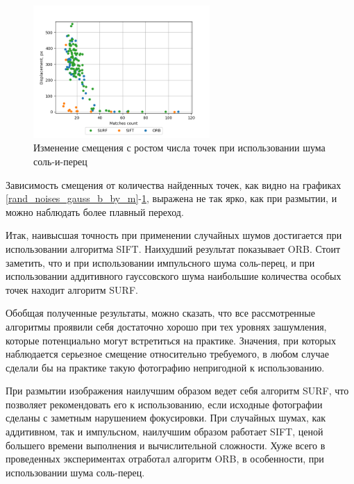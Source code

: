 {{{	\begin{figure}[H]
		\centering                             
		\includegraphics[width=0.6\textwidth,keepaspectratio]{ex2/sp/Rand_noises_d_by_m.png}      
		\centering\caption{  Изменение смещения с ростом числа точек при использовании шума соль-и-перец}
		\label{rand_noises_sp_b_by_m}                           
	\end{figure} 
	
	Зависимость смещения от количества найденных точек, как видно на графиках \ref{rand_noises_gauss_b_by_m}-\ref{rand_noises_sp_b_by_m}, выражена не так ярко, как при размытии, и можно наблюдать более плавный переход.
	
	Итак, наивысшая точность при применении случайных шумов достигается при использовании алгоритма SIFT. Наихудший результат показывает ORB. Стоит заметить, что и при использовании импульсного шума соль-перец, и при использовании аддитивного гауссовского шума наибольшие количества особых точек находит алгоритм SURF.
	
	Обобщая полученные результаты, можно сказать, что все рассмотренные алгоритмы проявили себя достаточно хорошо при тех уровнях зашумления, которые потенциально могут встретиться на практике. Значения, при которых наблюдается серьезное смещение относительно требуемого, в любом случае сделали бы на практике такую фотографию непригодной к использованию. 
	
	При размытии изображения наилучшим образом ведет себя алгоритм SURF, что позволяет рекомендовать его к использованию, если исходные фотографии сделаны с заметным нарушением фокусировки.
	При случайных шумах, как аддитивном, так и импульсном, наилучшим образом работает SIFT, ценой большего времени выполнения и вычислительной сложности. 
	Хуже всего в проведенных экспериментах отработал алгоритм ORB, в особенности, при использовании шума соль-перец.
}
\newpage



}}
